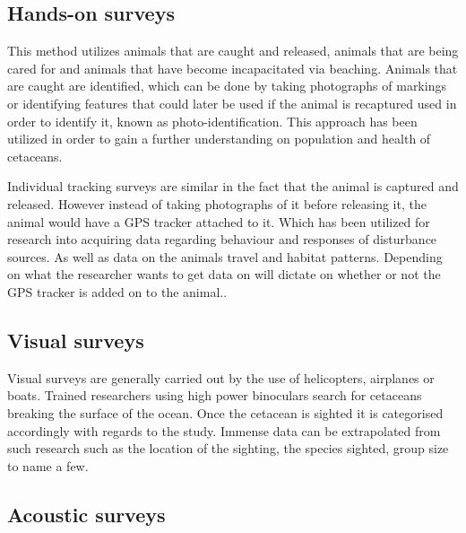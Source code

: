 \subsection{Hands-on surveys}

This method utilizes animals that are caught and released, animals that are being cared for and animals that have become incapacitated via beaching. 
Animals that are caught are identified, which can be done by taking photographs of markings or identifying features that could later be used if the animal is recaptured used in order to identify it, known as photo-identification\cite{booth_methods_2020}.
This approach has been utilized in order to gain a further understanding on population and health of cetaceans.

Individual tracking surveys are similar in the fact that the animal is captured and released.
However instead of taking photographs of it before releasing it, the animal would have a GPS tracker attached to it. 
Which has been utilized for research into acquiring data regarding behaviour and responses of disturbance sources. 
As well as data on the animals travel and habitat patterns. 
Depending on what the researcher wants to get data on will dictate on whether or not the GPS tracker is added on to the animal.\cite{booth_methods_2020}.

\subsection{Visual surveys}%

Visual surveys are generally carried out by the use of helicopters, airplanes or boats.
Trained researchers using high power binoculars search for cetaceans breaking the surface of the ocean. Once the cetacean is sighted it is categorised accordingly with regards to the study.
Immense data can be extrapolated from such research such as the location of the sighting, the species sighted, group size to name a few\cite{campbell_inter-annual_2015}.


\subsection{Acoustic surveys}

